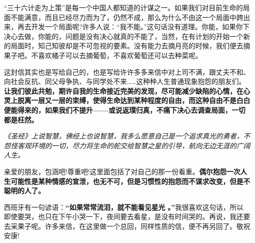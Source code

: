 \documentclass[UTF8,a4paper,8pt]{ctexbook}
\begin{document}
	“三十六计走为上策”是每一个中国人都知道的计谋之一。如果我们对目前生命的局面不能满意，而且已经尽力而为了，仍然不成，那么为什么不由这一个局面中跨出来，再去开发一个局面呢?许多人说：“我不能。”这句话没有道理。你能，如果你下决心去做，你能的，问题是没有决心就真的不能了，当然，在有计划的开始一个新的局面时，知己知彼却是不可忽视的要素。没有能力去摘月亮的时候，我们便去摘果子吧。不喜欢橘子可以去摘葡萄，不喜欢葡萄还可以去种菜呢。
	
	这封信其实也是写给自己的，也是写给许许多多来信中对上司不满，跟丈夫不和、向社会反抗、同父母争执、与同学处不来……这种种人生普通现象抱怨的朋友们。\textbf{让我们彼此共勉，期许自我的生命接近完美的发现，尽可能减少缺陷的心情，在心灵上脱离一层又一层的束缚，使得生命达到某种程度的自由，而这种自由不是白白便能得来的，如果我们不提升——或说返璞归真，不痛下决心去调查局面，一切都是枉然。}
	
	\textit{《圣经》上说智慧，佛经上也说智慧，我多么愿意自己是一个追求真光的勇者，不怨怪客观环境的一切，尽力将生命的舵交给智慧之星的引导，航向无边无涯的广阔人生。}
	
	亲爱的朋友，包涵吧!尊重吧!这里面包括了对自己的那一份看重。\textbf{偶尔抱怨一次人生可能性是某种情感的宣泄，也无不可，但是习惯性的抱怨而不谋求改变，但是不聪明的人了。}
	
	西班牙有一句谚语：\textbf{“如果常常流泪，就不能看见星光 。”}我很喜欢这句话，所以即使要哭，也只在下午小哭一下，夜间要去看星，是没有时间哭的。再说，我还要去采果子呢。许多来信，在这里做一个总回，同样性质的信，便不再另回了。敬祝  安康!	 
	 
	 
\newpage
\end{document}
